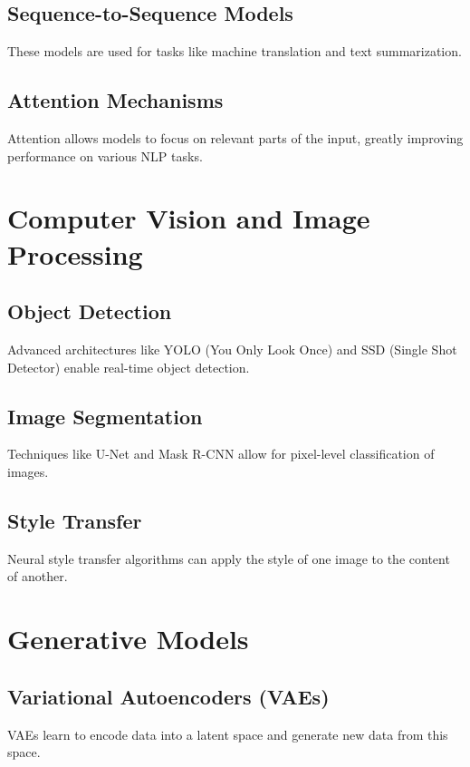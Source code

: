 \subsection{Sequence-to-Sequence Models}

These models are used for tasks like machine translation and text
summarization.

\subsection{Attention Mechanisms}

Attention allows models to focus on relevant parts of the input, greatly
improving performance on various NLP tasks.

\section{Computer Vision and Image Processing}

\subsection{Object Detection}

Advanced architectures like YOLO (You Only Look Once) and SSD (Single
Shot Detector) enable real-time object detection.

\subsection{Image Segmentation}

Techniques like U-Net and Mask R-CNN allow for pixel-level
classification of images.

\subsection{Style Transfer}

Neural style transfer algorithms can apply the style of one image to the
content of another.

\section{Generative Models}

\subsection{Variational Autoencoders (VAEs)}

VAEs learn to encode data into a latent space and generate new data from
this space.

